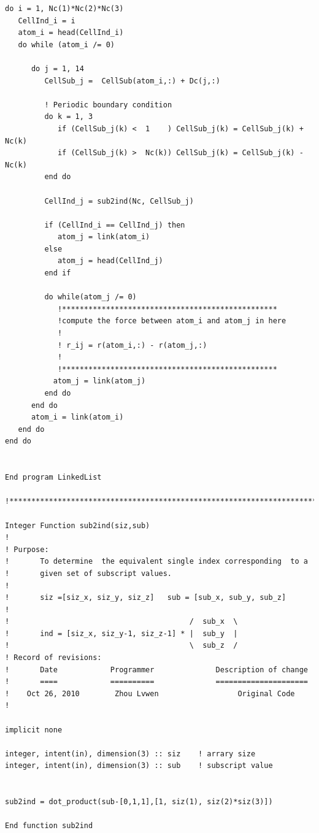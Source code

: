 \documentclass[a4paper]{article}
\begin{document}
\begin{verbatim}
do i = 1, Nc(1)*Nc(2)*Nc(3)
   CellInd_i = i
   atom_i = head(CellInd_i)
   do while (atom_i /= 0)

      do j = 1, 14
         CellSub_j =  CellSub(atom_i,:) + Dc(j,:)

         ! Periodic boundary condition
         do k = 1, 3
            if (CellSub_j(k) <  1    ) CellSub_j(k) = CellSub_j(k) + Nc(k)
            if (CellSub_j(k) >  Nc(k)) CellSub_j(k) = CellSub_j(k) - Nc(k)
         end do

         CellInd_j = sub2ind(Nc, CellSub_j)

         if (CellInd_i == CellInd_j) then
            atom_j = link(atom_i)
         else
            atom_j = head(CellInd_j)
         end if

         do while(atom_j /= 0)
            !*************************************************
            !compute the force between atom_i and atom_j in here
            !
            ! r_ij = r(atom_i,:) - r(atom_j,:)
            !
            !*************************************************
           atom_j = link(atom_j)
         end do
      end do
      atom_i = link(atom_i)
   end do
end do


End program LinkedList

!**************************************************************************************

Integer Function sub2ind(siz,sub)
!
! Purpose:
!       To determine  the equivalent single index corresponding  to a
!       given set of subscript values.
!
!       siz =[siz_x, siz_y, siz_z]   sub = [sub_x, sub_y, sub_z]
!
!                                         /  sub_x  \
!       ind = [siz_x, siz_y-1, siz_z-1] * |  sub_y  |
!                                         \  sub_z  /
! Record of revisions:
!       Date            Programmer              Description of change
!       ====            ==========              =====================
!    Oct 26, 2010        Zhou Lvwen                  Original Code
!

implicit none

integer, intent(in), dimension(3) :: siz	! arrary size
integer, intent(in), dimension(3) :: sub	! subscript value


sub2ind = dot_product(sub-[0,1,1],[1, siz(1), siz(2)*siz(3)])

End function sub2ind
\end{verbatim}
\end{document}
